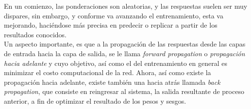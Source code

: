 \begin{itemize}
{\begin{enumerate}
\begin{enumerate}
{            En un comienzo, las ponderaciones son aleatorias, y las respuestas suelen ser muy dispares, sin embargo, y conforme va avanzando el entrenamiento, esta va mejorando, haciéndose más precisa en predecir o replicar a partir de los resultados conocidos.\\
            
            Un aspecto importante, es que a la propagación de las respuestas desde las capas de entrada hacia la capa de salida, se le llama \textit{forward propagation} o \textit{propagación hacia adelante} y cuyo objetivo, así como el del entrenamiento en general es minimizar el costo computacional de la red. Ahora, así como existe la propagación hacia adelante, existe también una hacia atrás llamada \textit{back propagation}, que consiste en reingresar al sistema, la salida resultante de proceso anterior, a fin de optimizar el resultado de los pesos y sesgos. }
            \end{enumerate}
        \end{enumerate}
            }
    \end{itemize}
    